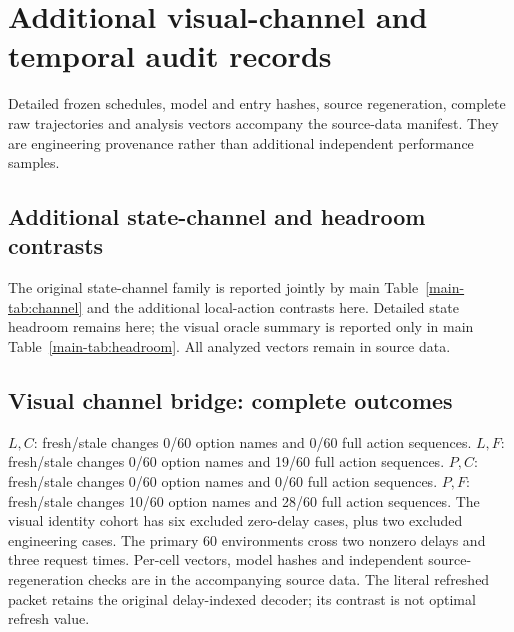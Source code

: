 \section{Additional visual-channel and temporal audit records}
Detailed frozen schedules, model and entry hashes, source regeneration, complete raw trajectories and analysis vectors accompany the source-data manifest. They are engineering provenance rather than additional independent performance samples.

\subsection{Additional state-channel and headroom contrasts}



The original state-channel family is reported jointly by main Table~\ref{main-tab:channel} and the additional local-action contrasts here. Detailed state headroom remains here; the visual oracle summary is reported only in main Table~\ref{main-tab:headroom}. All analyzed vectors remain in source data.

\subsection{Visual channel bridge: complete outcomes}

$L,C$: fresh/stale changes 0/60 option names and 0/60 full action sequences. 
$L,F$: fresh/stale changes 0/60 option names and 19/60 full action sequences. 
$P,C$: fresh/stale changes 0/60 option names and 0/60 full action sequences. 
$P,F$: fresh/stale changes 10/60 option names and 28/60 full action sequences. 
The visual identity cohort has six excluded zero-delay cases, plus two excluded engineering cases. The primary 60 environments cross two nonzero delays and three request times. Per-cell vectors, model hashes and independent source-regeneration checks are in the accompanying source data. The literal refreshed packet retains the original delay-indexed decoder; its contrast is not optimal refresh value.
